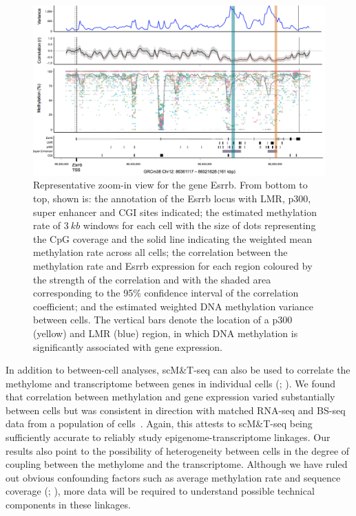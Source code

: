 \begin{figure}[htbp!]
\centering
\includegraphics[width=1.0\textwidth]{zoom}
\caption[Representative zoom-in view for the gene Esrrb.]{Representative zoom-in view for the gene Esrrb. From bottom to top, shown is: the annotation of the Esrrb locus with LMR, p300, super enhancer and CGI sites indicated; the estimated methylation rate of $3~kb$ windows for each cell with the size of dots representing the CpG coverage and the solid line indicating the weighted mean methylation rate across all cells; the correlation between the methylation rate and Esrrb expression for each region coloured by the strength of the correlation and with the shaded area corresponding to the 95\% confidence interval of the correlation coefficient; and the estimated weighted DNA methylation variance between cells. The vertical bars denote the location of a p300 (yellow) and LMR (blue) region, in which DNA methylation is significantly associated with gene expression.}
\label{fig:mt_zoom}
\end{figure}

In addition to between-cell analyses, scM\&T-seq can also be used to correlate the methylome and transcriptome between genes in individual cells (; ). We found that correlation between methylation and gene expression varied substantially between cells but was consistent in direction with matched RNA-seq and BS-seq data from a population of cells~\citep{ficz_fgf_2013}. Again, this attests to scM\&T-seq being sufficiently accurate to reliably study epigenome-transcriptome linkages. Our results also point to the possibility of heterogeneity between cells in the degree of coupling between the methylome and the transcriptome. Although we have ruled out obvious confounding factors such as average methylation rate and sequence coverage (; ), more data will be required to understand possible technical components in these linkages.

